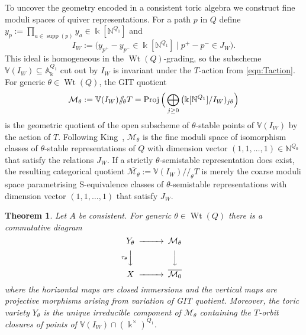 \documentclass[11pt,a4paper]{amsart}
\numberwithin{equation}{section}
\newtheorem{theorem}{Theorem}[section]
\theoremstyle{definition}
\theoremstyle{remark}
\newcommand{\kk}{\ensuremath{\Bbbk}}
\newcommand{\NN}{\ensuremath{\mathbb{N}}}
\newcommand{\git}{\ensuremath{/\!\!/\!}}
\newcommand{\supp}{\operatorname{supp}}
\newcommand{\Proj}{\operatorname{Proj}}
\newcommand{\Wt}{\operatorname{Wt}}
\begin{document}
 To uncover the geometry encoded in a consistent toric algebra we construct fine moduli spaces of quiver representations. For a path $p$ in $Q$ define $y_p:=\prod_{a\in  \supp(p)} y_a\in \kk[\NN^{Q_1}]$ and
 \[ I_W:= \big(y_{p^+}-y_{p^-}\in \kk[\NN^{Q_1}] \mid p^+-p^-\in J_W\big). \]
 This ideal is homogeneous in the $\Wt(Q)$-grading, so the subscheme $\mathbb{V}(I_W)\subseteq \mathbb{A}^{Q_1}_\kk$ cut out by $I_W$ is invariant under the $T$-action from \eqref{eqn:Taction}. For generic $\theta\in \Wt(Q)$,  the GIT quotient 
\[
\mathcal{M}_\theta:= \mathbb{V}(I_W)\git_\theta T = \Proj \Big{(}\bigoplus_{j \geq 0} \big(\kk[\NN^{Q_1}]/I_W)_{j \theta} \Big{)}\]
is the geometric quotient of the open subscheme of $\theta$-stable points of $\mathbb{V}(I_W)$ by the action of $T$. Following King~\cite{King}, $\mathcal{M}_\theta$ is the fine moduli space of isomorphism classes of $\theta$-stable representations of $Q$ with dimension vector $(1,1,\dots,1)\in \NN^{Q_0}$ that satisfy the relations $J_W$.  If a strictly $\theta$-semistable representation does exist, the resulting categorical quotient $\overline{\mathcal{M}_\theta}:= \mathbb{V}(I_W)\git_\theta T$ is merely the coarse moduli space parametrising S-equivalence classes of $\theta$-semistable representations with dimension vector $(1,1,\dots,1)$ that satisfy $J_W$.
    
 \begin{theorem}
 \label{thm:cohcomp}
 Let $A$ be consistent. For generic $\theta\in \Wt(Q)$ there is a commutative diagram
 \[
 \begin{CD}   
  Y_\theta @>>> \mathcal{M}_\theta \\
     @V{\tau_\theta}VV   @VVV    \\
X @>>> \overline{\mathcal{M}_0} \\
 \end{CD}
 \]
 where the horizontal maps are closed immersions and the vertical maps are projective morphisms arising from variation of GIT quotient. Moreover, the toric variety $Y_\theta$ is the unique irreducible component of $\mathcal{M}_\theta$ containing the $T$-orbit closures of points of $\mathbb{V}(I_W)\cap (\kk^\times)^{Q_1}$. 
 \end{theorem}
 
\end{document}
